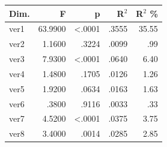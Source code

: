 \begin{table}
\begin{tabular}{lrrrr}
\toprule
Dim. & F & p & R$^2$ & R$^2$ \% \\
\midrule
ver1 & 63.9900 & <.0001 & .3555 & 35.55 \\
ver2 & 1.1600 & .3224 & .0099 & .99 \\
ver3 & 7.9300 & <.0001 & .0640 & 6.40 \\
ver4 & 1.4800 & .1705 & .0126 & 1.26 \\
ver5 & 1.9200 & .0634 & .0163 & 1.63 \\
ver6 & .3800 & .9116 & .0033 & .33 \\
ver7 & 4.5200 & <.0001 & .0375 & 3.75 \\
ver8 & 3.4000 & .0014 & .0285 & 2.85 \\
\bottomrule
\end{tabular}
\end{table}
